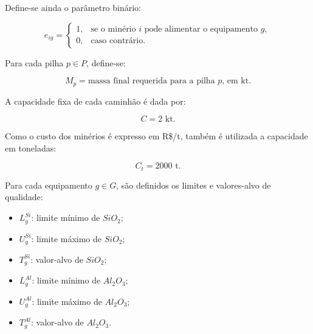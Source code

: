 \documentclass[12pt,a4paper]{article}
\begin{document}
Define-se ainda o parâmetro binário:

\begin{equation}
e_{ig} =
\begin{cases}
1, & \text{se o minério $i$ pode alimentar o equipamento $g$},\\
0, & \text{caso contrário}.
\end{cases}
\end{equation}

Para cada pilha $p \in P$, define-se:

\begin{equation}
    M_p = \text{massa final requerida para a pilha $p$, em kt}.
\end{equation}

A capacidade fixa de cada caminhão é dada por:

\begin{equation}
    C = 2 \text{ kt}.
\end{equation}

Como o custo dos minérios é expresso em R\$/t, também é utilizada a
capacidade em toneladas:

\begin{equation}
    C_t = 2000 \text{ t}.
\end{equation}

Para cada equipamento $g \in G$, são definidos os limites e valores-alvo
de qualidade:

\begin{itemize}

    \item $L_g^{Si}$: limite mínimo de $SiO_2$;

    \item $U_g^{Si}$: limite máximo de $SiO_2$;

    \item $T_g^{Si}$: valor-alvo de $SiO_2$;

    \item $L_g^{Al}$: limite mínimo de $Al_2O_3$;

    \item $U_g^{Al}$: limite máximo de $Al_2O_3$;

    \item $T_g^{Al}$: valor-alvo de $Al_2O_3$.

\end{itemize}


\end{document}
